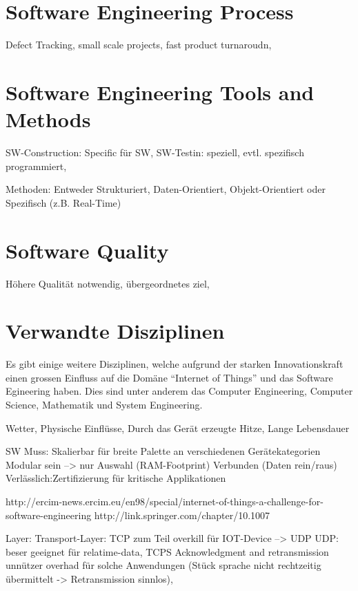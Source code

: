 \section{Software Engineering Process}
Defect Tracking, small scale projects, fast product turnaroudn, 



\section{Software Engineering Tools and Methods}
SW-Construction: Specific für SW, 
SW-Testin: speziell, evtl. spezifisch programmiert, 

Methoden: Entweder Strukturiert, Daten-Orientiert, Objekt-Orientiert oder Spezifisch (z.B. Real-Time)


\section{Software Quality}
Höhere Qualität notwendig, übergeordnetes ziel, 


\section{Verwandte Disziplinen}
Es gibt einige weitere Disziplinen, welche aufgrund der starken Innovationskraft einen grossen Einfluss auf die Domäne "`Internet of Things"' und das Software Egineering haben. Dies sind unter anderem das Computer Engineering, Computer Science, Mathematik und System Engineering.








Wetter, Physische Einflüsse, Durch das Gerät erzeugte Hitze, Lange Lebensdauer

SW Muss: Skalierbar für breite Palette an verschiedenen Gerätekategorien
Modular sein --> nur Auswahl (RAM-Footprint)
Verbunden (Daten rein/raus)
Verlässlich:Zertifizierung für kritische Applikationen


http://ercim-news.ercim.eu/en98/special/internet-of-things-a-challenge-for-software-engineering
http://link.springer.com/chapter/10.1007%

Layer: Transport-Layer: TCP zum Teil overkill für IOT-Device --> UDP
UDP: beser geeignet für relatime-data, TCPS Acknowledgment and retransmission unnützer overhad für solche Anwendungen (Stück sprache nicht rechtzeitig übermittelt -> Retransmission sinnlos), 


